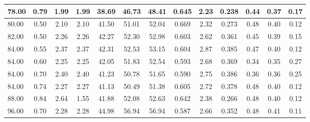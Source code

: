 \begin{longtable}{lc|cccc|cc|cc|ccc}
78.00 & 0.79 & 1.99 & 1.99 & 38.69 & 46.73 & 48.41 & 0.645 & 2.23 & 0.238 & 0.44 & 0.37 & 0.17\\
\hline
80.00 & 0.50 & 2.10 & 2.10 & 41.50 & 51.01 & 52.04 & 0.669 & 2.32 & 0.273 & 0.48 & 0.40 & 0.12\\
\hline
82.00 & 0.50 & 2.26 & 2.26 & 42.27 & 52.30 & 52.98 & 0.603 & 2.62 & 0.361 & 0.45 & 0.39 & 0.15\\
\hline
84.00 & 0.55 & 2.37 & 2.37 & 42.31 & 52.53 & 53.15 & 0.604 & 2.87 & 0.385 & 0.47 & 0.40 & 0.12\\
84.00 & 0.60 & 2.25 & 2.25 & 42.05 & 51.83 & 52.54 & 0.593 & 2.68 & 0.369 & 0.34 & 0.35 & 0.27\\
84.00 & 0.70 & 2.40 & 2.40 & 41.23 & 50.78 & 51.65 & 0.590 & 2.75 & 0.386 & 0.36 & 0.36 & 0.25\\
84.00 & 0.74 & 2.27 & 2.27 & 41.13 & 50.49 & 51.38 & 0.605 & 2.72 & 0.378 & 0.48 & 0.40 & 0.12\\
\hline
88.00 & 0.84 & 2.64 & 1.55 & 41.88 & 52.08 & 52.63 & 0.642 & 2.38 & 0.266 & 0.48 & 0.40 & 0.12\\
\hline
96.00 & 0.70 & 2.28 & 2.28 & 44.98 & 56.94 & 56.94 & 0.587 & 2.66 & 0.352 & 0.48 & 0.41 & 0.11\\
  \hline
\end{longtable}


